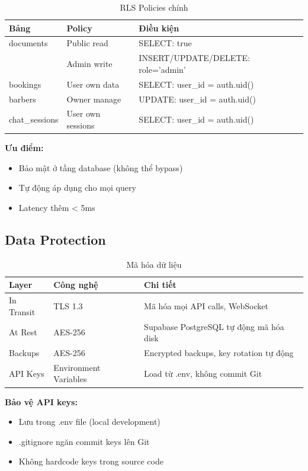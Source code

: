 \begin{table}[H]
\centering
\caption{RLS Policies chính}
\begin{tabular}{|l|l|p{5cm}|}
\hline
\textbf{Bảng} & \textbf{Policy} & \textbf{Điều kiện} \\
\hline
documents & Public read & SELECT: true \\
& Admin write & INSERT/UPDATE/DELETE: role='admin' \\
\hline
bookings & User own data & SELECT: user\_id = auth.uid() \\
\hline
barbers & Owner manage & UPDATE: user\_id = auth.uid() \\
\hline
chat\_sessions & User own sessions & SELECT: user\_id = auth.uid() \\
\hline
\end{tabular}
\end{table}

\textbf{Ưu điểm:}
\begin{itemize}
    \item Bảo mật ở tầng database (không thể bypass)
    \item Tự động áp dụng cho mọi query
    \item Latency thêm < 5ms
\end{itemize}

\subsection{Data Protection}

\begin{table}[H]
\centering
\caption{Mã hóa dữ liệu}
\begin{tabular}{|l|l|p{6cm}|}
\hline
\textbf{Layer} & \textbf{Công nghệ} & \textbf{Chi tiết} \\
\hline
In Transit & TLS 1.3 & Mã hóa mọi API calls, WebSocket \\
\hline
At Rest & AES-256 & Supabase PostgreSQL tự động mã hóa disk \\
\hline
Backups & AES-256 & Encrypted backups, key rotation tự động \\
\hline
API Keys & Environment Variables & Load từ .env, không commit Git \\
\hline
\end{tabular}
\end{table}

\textbf{Bảo vệ API keys:}
\begin{itemize}
    \item Lưu trong .env file (local development)
    \item .gitignore ngăn commit keys lên Git
    \item Không hardcode keys trong source code
\end{itemize}

